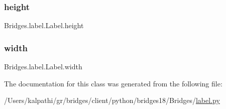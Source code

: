 \subsubsection{\texorpdfstring{height}{height}}
{\footnotesize\ttfamily Bridges.\+label.\+Label.\+height}

\mbox{\label{class_bridges_1_1label_1_1_label_a47c8f760dbd7b2a2e5dc3b94bc9d9ce2}} 
\subsubsection{\texorpdfstring{width}{width}}
{\footnotesize\ttfamily Bridges.\+label.\+Label.\+width}



The documentation for this class was generated from the following file\+:\begin{DoxyCompactItemize}
\item 
/\+Users/kalpathi/gr/bridges/client/python/bridges18/\+Bridges/\mbox{\hyperlink{label_8py}{label.\+py}}\end{DoxyCompactItemize}
